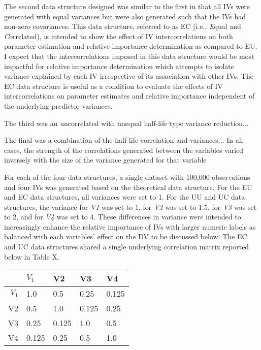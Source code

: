 \documentclass[ShortAfour,times,sageapa]{sagej}
\begin{document}
	The second data structure designed was similar to the first in that all IVs were generated with equal variances but were also generated such that the IVs had non-zero covariances. 
	This data structure, referred to as EC (i.e., \emph{E}qual and \emph{C}orrelated), is intended to show the effect of IV intercorrelations on both parameter estimation and relative importance determination as compared to EU.  
	I expect that the intercorrelations imposed in this data structure would be most impactful for relative importance determination which attempts to isolate variance explained by each IV irrespective of its association with other IVs.
	The EC data structure is useful as a condition to evaluate the effects of IV intercorrelations on parameter estimates and relative importance independent of the underlying predictor variances.
	
	The third was an uncorrelated with unequal half-life type variance reduction...
	
	The final was a combination of the half-life correlation and variances...
	In all cases, the strength of the correlations generated between the variables varied inversely with the size of the variance generated for that variable %
	
	For each of the four data structures, a single dataset with 100,000 observations and four IVs was generated based on the theoretical data structure.  
	For the EU and EC data structures, all variances were set to 1. For the UU and UC data structures, the variance for \emph{V1} was set to 1, for \emph{V2} was set to 1.5, for \emph{V3} was set to 2, and for \emph{V4} was set to 4. 
	These differences in variance were intended to increasingly enhance the relative importance of IVs with larger numeric labels as balanced with each variables' effect on the DV to be discussed below.  
	The EC and UC data structures shared a single underlying correlation matrix reported below in Table X.
	
	\medskip
	
	\begin{center}

	\begin{tabular}[5]{r|llll}
		& $V_1$ & V2 & V3 & V4 \\
		\toprule
		$V_1$ & 1.0 & 0.5 & 0.25 & 0.125 \\
		V2 & 0.5 & 1.0 & 0.125 & 0.25 \\
		V3 & 0.25 & 0.125 & 1.0 & 0.5 \\
		V4 & 0.125 & 0.25 & 0.5 & 1.0
	\end{tabular}

	\end{center}
	
\end{document}
